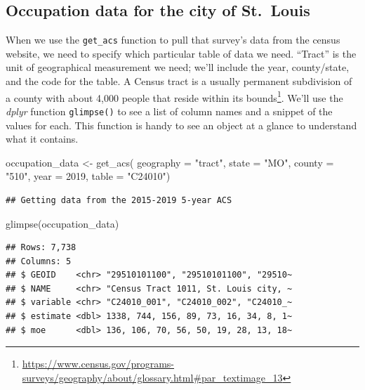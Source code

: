 \documentclass[
  krantz2]{krantz}
\makeatletter
\newenvironment{Shaded}{\begin{snugshade}}{\end{snugshade}}
\newcommand{\AttributeTok}[1]{\textcolor[rgb]{0.61,0.61,0.61}{#1}}
\newcommand{\DecValTok}[1]{\textcolor[rgb]{0.06,0.06,0.06}{#1}}
\newcommand{\FunctionTok}[1]{\textcolor[rgb]{0,0,0}{#1}}
\newcommand{\NormalTok}[1]{#1}
\newcommand{\OtherTok}[1]{\textcolor[rgb]{0.37,0.37,0.37}{#1}}
\newcommand{\StringTok}[1]{\textcolor[rgb]{0.5,0.5,0.5}{#1}}
\newenvironment{kframe}{%
\medskip{}
\setlength{\fboxsep}{.8em}
 \def\at@end@of@kframe{}%
 \ifinner\ifhmode%
  \def\at@end@of@kframe{\end{minipage}}%
  \begin{minipage}{\columnwidth}%
 \fi\fi%
 \def\FrameCommand##1{\hskip\@totalleftmargin \hskip-\fboxsep
 \colorbox{shadecolor}{##1}\hskip-\fboxsep
     \hskip-\linewidth \hskip-\@totalleftmargin \hskip\columnwidth}%
 \MakeFramed {\advance\hsize-\width
   \@totalleftmargin\z@ \linewidth\hsize
   \@setminipage}}%
 {\par\unskip\endMakeFramed%
 \at@end@of@kframe}
\renewenvironment{Shaded}{\begin{kframe}}{\end{kframe}}
\makeatother
\begin{document}
\hypertarget{occupation-data-for-the-city-of-st.-louis}{%
\subsection{Occupation data for the city of St.~Louis}\label{occupation-data-for-the-city-of-st.-louis}}

When we use the \texttt{get\_acs} function to pull that survey's data from the census website, we need to specify which particular table of data we need. ``Tract'' is the unit of geographical measurement we need; we'll include the year, county/state, and the code for the table. A Census tract is a usually permanent subdivision of a county with about 4,000 people that reside within its bounds\footnote{\url{https://www.census.gov/programs-surveys/geography/about/glossary.html\#par_textimage_13}}. We'll use the \emph{dplyr} function \texttt{glimpse()} to see a list of column names and a snippet of the values for each. This function is handy to see an object at a glance to understand what it contains.

\begin{Shaded}
\begin{Highlighting}[]
\NormalTok{occupation\_data  }\OtherTok{\textless{}{-}} \FunctionTok{get\_acs}\NormalTok{(}
  \AttributeTok{geography =} \StringTok{"tract"}\NormalTok{, }
  \AttributeTok{state =} \StringTok{"MO"}\NormalTok{, }
  \AttributeTok{county =} \StringTok{"510"}\NormalTok{, }
  \AttributeTok{year =} \DecValTok{2019}\NormalTok{, }
  \AttributeTok{table =} \StringTok{"C24010"}\NormalTok{)}
\end{Highlighting}
\end{Shaded}

\begin{verbatim}
## Getting data from the 2015-2019 5-year ACS
\end{verbatim}

\begin{Shaded}
\begin{Highlighting}[]
\FunctionTok{glimpse}\NormalTok{(occupation\_data)}
\end{Highlighting}
\end{Shaded}

\begin{verbatim}
## Rows: 7,738
## Columns: 5
## $ GEOID    <chr> "29510101100", "29510101100", "29510~
## $ NAME     <chr> "Census Tract 1011, St. Louis city, ~
## $ variable <chr> "C24010_001", "C24010_002", "C24010_~
## $ estimate <dbl> 1338, 744, 156, 89, 73, 16, 34, 8, 1~
## $ moe      <dbl> 136, 106, 70, 56, 50, 19, 28, 13, 18~
\end{verbatim}
\end{document}
